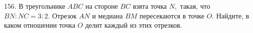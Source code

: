 156. В треугольнике $ABC$ на стороне $BC$ взята точка $N,$ такая, что $BN : NC=3:2.$ Отрезок $AN$ и медиана
$BM$ пересекаются в точке $O.$ Найдите, в каком отношении точка $O$ делит каждый из этих отрезков.\\
